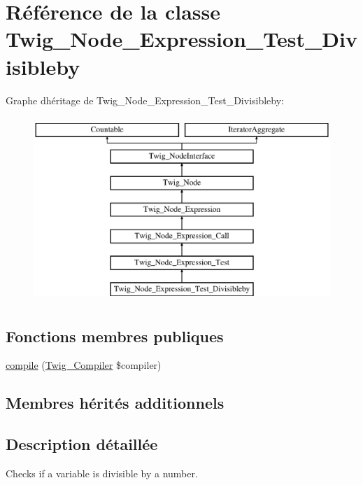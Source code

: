 \hypertarget{class_twig___node___expression___test___divisibleby}{}\section{Référence de la classe Twig\+\_\+\+Node\+\_\+\+Expression\+\_\+\+Test\+\_\+\+Divisibleby}
\label{class_twig___node___expression___test___divisibleby}
Graphe d\textquotesingle{}héritage de Twig\+\_\+\+Node\+\_\+\+Expression\+\_\+\+Test\+\_\+\+Divisibleby\+:\begin{figure}[H]
\begin{center}
\leavevmode
\includegraphics[height=7.000000cm]{class_twig___node___expression___test___divisibleby}
\end{center}
\end{figure}
\subsection*{Fonctions membres publiques}
\begin{DoxyCompactItemize}
\item 
\hyperlink{class_twig___node___expression___test___divisibleby_a4e0faa87c3fae583620b84d3607085da}{compile} (\hyperlink{class_twig___compiler}{Twig\+\_\+\+Compiler} \$compiler)
\end{DoxyCompactItemize}
\subsection*{Membres hérités additionnels}


\subsection{Description détaillée}
Checks if a variable is divisible by a number.


